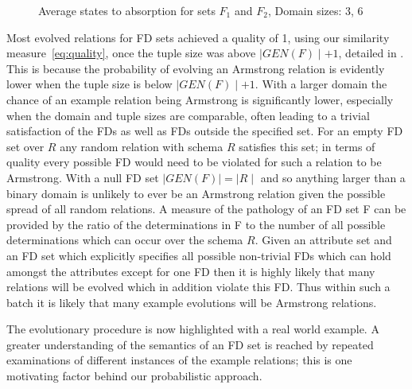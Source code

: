 \begin{figure}
\centerline{}
\caption{\label{graph:16_82}{Average states to absorption for sets $F_1$ and $F_2$, Domain sizes: 3, 6 }}
\end{figure}
Most evolved relations for FD sets achieved a quality of 1, using
our similarity measure~\ref{eq:quality}, once the
tuple size was above $\mid GEN(F) \mid + 1$, detailed in \cite{cl96}.
 This is because the probability
of evolving an Armstrong relation is evidently lower when the tuple size
 is below
$\mid GEN(F) \mid + 1$. With a larger domain the chance of an example
relation being Armstrong is significantly lower, especially when the
domain and tuple sizes are comparable, often leading to a trivial
satisfaction of the FDs as well as FDs outside the specified set.
For an empty FD set over $R$ any random relation with schema $R$ satisfies this set;
in terms of quality every possible FD would need to be violated for such
a relation to be Armstrong.
 With a null FD set $\mid GEN(F) \mid = \mid R \mid$ and so
anything larger than a binary domain is unlikely to ever be an Armstrong
relation given the possible spread of all random relations. A measure
of the pathology of an FD set F can be
 provided by the ratio
of the determinations in F to the number of all possible determinations
which can occur over the schema $R$.
Given an attribute set and an FD set
which explicitly specifies all possible non-trivial FDs which
can hold amongst the attributes except for one FD then it is highly likely that
many relations will be evolved which in addition violate this FD. Thus within
such a batch it is likely that many example evolutions will be Armstrong
relations. 

\medskip

The evolutionary procedure is now highlighted with a real world 
example. A greater understanding of the semantics of 
an FD set
is reached by repeated examinations of different instances of the
example relations; this is one motivating factor behind our probabilistic approach.

